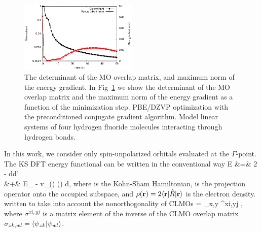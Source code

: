\documentclass[aps,prl,twocolumn,reprint,amsmath,amssymb]{revtex4-1}
\begin{document}
\begin{figure}
\includegraphics[width=0.5\textwidth]{det}
\caption{
The determinant of the MO overlap matrix, and maximum norm of the energy gradient. In Fig~\ref{fig:det} we show the determinant of the MO overlap matrix and the maximum norm of the energy gradient as a function of the minimization step. PBE/DZVP optimization with the preconditioned conjugate gradient algorithm. Model linear systems of four hydrogen fluoride molecules interacting through hydrogen bonds.}
\label{fig:det}
\end{figure}

In this work, we consider only spin-unpolarized orbitals evaluated at the $\Gamma$-point. The KS DFT energy functional can be written in the conventional way 
\bea
E &=& 2 \trace \left[ \op{R} \op{H} \right] -  \int\int {}d\br d\br' \nonumber \\
 &+& E_{} - \int v_{}(\br) \rho(\br) d\br,
\eea
%
where  is the Kohn-Sham Hamiltonian,  is the projection operator onto the occupied subspace, and $\rho(\mathbf{r}) = 2\langle \mathbf{r} \vert\hat{R}\vert \mathbf{r} \rangle$ is the electron density.  written to take into account the nonorthogonality of CLMOs
\bea \label{eq:dm}
 = \sum_{x,y}  \sigma^{xi,yj} ,
\eea
%
where $\sigma^{xi,yj}$ is a matrix element of the inverse of the CLMO overlap matrix $\sigma_{zk,wl} = \langle  \psi_{zk} \vert  \psi_{wl} \rangle $. %
\end{document}
